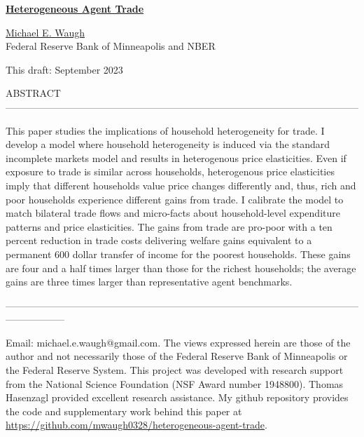 \documentclass[12pt,pdftex]{article}
\begin{document}
\begin{onehalfspacing}

{\large \textbf{\href{https://www.waugheconomics.com/uploads/2/2/5/6/22563786/heterogeneous-agent-trade.pdf}{Heterogeneous Agent Trade}}}

\vspace{0.5cm}

\href{http://www.waugheconomics.com/}{Michael E. Waugh} \\ Federal Reserve Bank of Minneapolis and NBER

\vspace{0.5cm}

This draft: September 2023

\vspace{1.5cm}


\normalsize

ABSTRACT ------------------------------------------------------------------------------------------------------------

This paper studies the implications of household heterogeneity for trade. I develop a model where household heterogeneity is induced via the standard incomplete markets model and results in heterogenous price elasticities. Even if exposure to trade is similar across households, heterogenous price elasticities imply that different households value price changes differently and, thus, rich and poor households experience different gains from trade. I calibrate the model to match bilateral trade flows and micro-facts about household-level expenditure patterns and price elasticities. The gains from trade are pro-poor with a ten percent reduction in trade costs delivering welfare gains equivalent to a permanent 600 dollar transfer of income for the poorest households. These gains are four and a half times larger than those for the richest households; the average gains are three times larger than representative agent benchmarks.

------------------------------------------------------------------------------------------------------------------------------
%

\vspace{6.0cm}

\footnotesize Email: michael.e.waugh@gmail.com. The views expressed herein are those of the author and not necessarily those of the Federal Reserve Bank of Minneapolis or the Federal Reserve System. This project was developed with research support from the National Science Foundation (NSF Award number 1948800). Thomas Hasenzagl provided excellent research assistance. My github repository provides the code and supplementary work behind this paper at \url{https://github.com/mwaugh0328/heterogeneous-agent-trade}.


\end{onehalfspacing}
\end{document}
